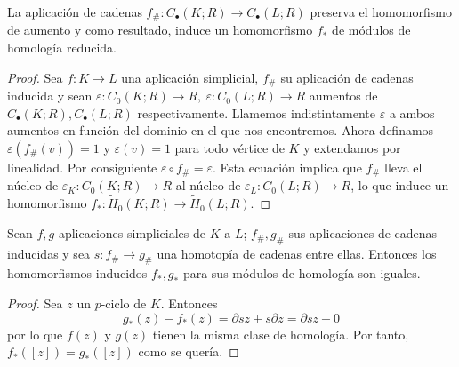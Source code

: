 \begin{lema}
	La aplicación de cadenas $f_\# : C_{\bullet}(K;R) \to C_{\bullet}(L;R)$ preserva el homomorfismo de aumento y como resultado, induce un homomorfismo $f_*$ de módulos de homología reducida.
\end{lema}
\begin{proof}
	Sea $f : K \to L$ una aplicación simplicial, $f_\#$ su aplicación de cadenas inducida y sean $\varepsilon : C_0(K;R) \to R,\ \varepsilon : C_0(L;R) \to R$ aumentos de $C_{\bullet}(K;R), C_{\bullet}(L;R)$ respectivamente. Llamemos indistintamente $\varepsilon$ a ambos aumentos en función del dominio en el que nos encontremos. Ahora definamos $\varepsilon (f_\#(v)) = 1$ y $\varepsilon(v) = 1$ para todo vértice de $K$ y extendamos por linealidad. Por consiguiente $\varepsilon \circ f_\# = \varepsilon$. Esta ecuación implica que $f_\#$ lleva el núcleo de $\varepsilon_K: C_0(K;R) \to R$ al núcleo de $\varepsilon_L : C_0(L;R) \to R$, lo que induce un homomorfismo $f_* : \widetilde{H}_0(K;R) \to \widetilde{H}_0(L;R)$.
\end{proof}
\begin{teorema}
	Sean $f, g$ aplicaciones simpliciales de $K$ a $L$; $f_\#, g_\#$ sus aplicaciones de cadenas inducidas y sea $s: f_\# \to g_\#$ una homotopía de cadenas entre ellas. Entonces los homomorfismos inducidos $f_*, g_*$ para sus módulos de homología son iguales.
\end{teorema}
\begin{proof}
	Sea $z$ un $p$-ciclo de $K$. Entonces
	\[
		g_*(z) - f_*(z) = \partial sz + s\partial z = \partial sz + 0
	\]
	por lo que $f(z)$ y $g(z)$ tienen la misma clase de homología. Por tanto, $f_*([z]) = g_*([z])$ como se quería.
\end{proof}
%
%	
